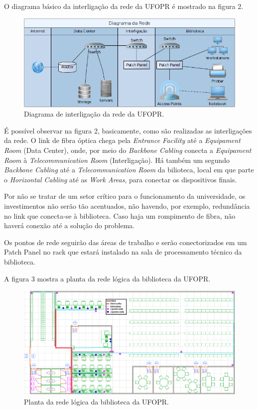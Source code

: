 \documentclass[	DIV=calc,%
							paper=a4,%
							fontsize=12pt,%
							onecolumn]{scrartcl}	 					%
\begin{document}
O diagrama básico da interligação da rede da UFOPR é mostrado na figura 2.

\begin{figure}[h!]
	\centering
	\includegraphics[width=\textwidth]{diagramaRede}
	\caption{Diagrama de interligação da rede da UFOPR.}
	\label{diagramaRede}
\end{figure}

É possível observar na figura 2, basicamente, como são realizadas as interligações da rede. O link de fibra óptica chega pela \textit{Entrance Facility} até a \textit{Equipament Room} (Data Center), onde, por meio do \textit{Backbone Cabling} conecta a \textit{Equipament Room} à \textit{Telecommunication Room} (Interligação). Há também um segundo \textit{Backbone Cabling} até a \textit{Telecommunication Room} da bilioteca, local em que parte o \textit{Horizontal Cabling} até as \textit{Work Areas}, para conectar os dispositivos finais.

Por não se tratar de um setor crítico para o funcionamento da universidade, os investimentos não serão tão acentuados, não havendo, por exemplo, redundância no link que conecta-se à biblioteca. Caso haja um rompimento de fibra, não haverá conexão até a solução do problema.

Os pontos de rede seguirão das áreas de trabalho e serão conectorizados em um Patch Panel no rack que estará instalado na sala de processamento técnico da biblioteca. 

A figura 3 mostra a planta da rede lógica da biblioteca da UFOPR.
\begin{figure}[h!]
	\centering
	\includegraphics[width=\textwidth]{planta-logica}
	\caption{Planta da rede lógica da biblioteca da UFOPR.}
	\label{planta-logica}
\end{figure}
\end{document}
